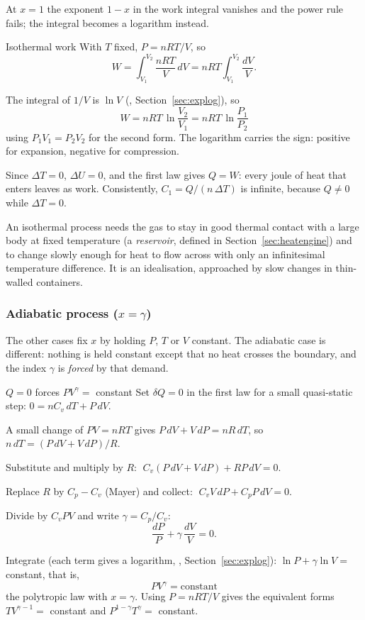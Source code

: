 At $x=1$ the exponent $1-x$ in the work integral vanishes and the power rule fails; the integral becomes
a logarithm instead.

\begin{derivbox}{Isothermal work}\label{der:isowork}
 With $T$ fixed, $P=nRT/V$, so
\[ W=\int_{V_1}^{V_2}\frac{nRT}{V}\,dV=nRT\int_{V_1}^{V_2}\frac{dV}{V} . \]

 The integral of $1/V$ is $\ln V$ (, Section~\ref{sec:explog}), so
\[ \boxed{\;W=nRT\,\ln\frac{V_2}{V_1}=nRT\,\ln\frac{P_1}{P_2}\;} \]
using $P_1V_1=P_2V_2$ for the second form. The logarithm carries the sign: positive for expansion,
negative for compression.

 Since $\Delta T=0$, $\Delta U=0$, and the first law gives $Q=W$: every joule of heat that enters
leaves as work. Consistently, $C_1=Q/(n\,\Delta T)$ is infinite, because $Q\neq0$ while $\Delta T=0$.
\end{derivbox}

An isothermal process needs the gas to stay in good thermal contact with a large body at fixed
temperature (a \emph{reservoir}, defined in Section~\ref{sec:heatengine}) and to change slowly enough for
heat to flow across with only an infinitesimal temperature difference. It is an idealisation, approached
by slow changes in thin-walled containers.

\subsubsection{Adiabatic process (\texorpdfstring{$x=\gamma$}{x = gamma})}\label{sec:adiabatic}

The other cases fix $x$ by holding $P$, $T$ or $V$ constant. The adiabatic case is different: nothing is
held constant except that no heat crosses the boundary, and the index $\gamma$ is \emph{forced} by that
demand.

\begin{derivbox}{\texorpdfstring{$Q=0$}{Q = 0} forces \texorpdfstring{$PV^\gamma=$}{PV gamma =} constant}\label{der:adiabat}
 Set $\delta Q=0$ in the first law for a small quasi-static step: $0=nC_v\,dT+P\,dV$.

 A small change of $PV=nRT$ gives $P\,dV+V\,dP=nR\,dT$, so $n\,dT=(P\,dV+V\,dP)/R$.

 Substitute and multiply by $R$: $\;C_v(P\,dV+V\,dP)+RP\,dV=0$.

 Replace $R$ by $C_p-C_v$ (Mayer) and collect: $\;C_vV\,dP+C_pP\,dV=0$.

 Divide by $C_vPV$ and write $\gamma=C_p/C_v$:
\[ \frac{dP}{P}+\gamma\,\frac{dV}{V}=0 . \]

 Integrate (each term gives a logarithm, , Section~\ref{sec:explog}):
$\ln P+\gamma\ln V=$ constant, that is,
\[ \boxed{\;PV^\gamma=\text{constant}\;} \]
the polytropic law with $x=\gamma$. Using $P=nRT/V$ gives the equivalent forms $TV^{\gamma-1}=$ constant
and $P^{1-\gamma}T^\gamma=$ constant.
\end{derivbox}

